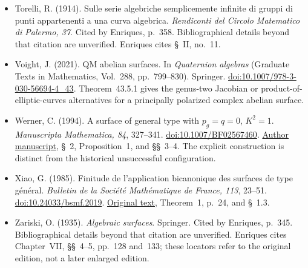 \begin{sloppypar}
\begin{itemize}
\item Torelli, R. (1914). Sulle serie algebriche semplicemente infinite di gruppi di punti appartenenti a una curva algebrica. \emph{Rendiconti del Circolo Matematico di Palermo, 37}. Cited by Enriques, p.~358. Bibliographical details beyond that citation are unverified. Enriques cites \S~II, no.~11.

\item Voight, J. (2021). QM abelian surfaces. In \emph{Quaternion algebras} (Graduate Texts in Mathematics, Vol.~288, pp.~799--830). Springer. \href{https://doi.org/10.1007/978-3-030-56694-4_43}{doi:10.1007/978-3-030-56694-4\_43}. Theorem~43.5.1 gives the genus-two Jacobian or product-of-elliptic-curves alternatives for a principally polarized complex abelian surface.

\item Werner, C. (1994). A surface of general type with $p_g=q=0$, $K^2=1$. \emph{Manuscripta Mathematica, 84}, 327--341. \href{https://doi.org/10.1007/BF02567460}{doi:10.1007/BF02567460}. \href{https://arxiv.org/abs/alg-geom/9408007}{Author manuscript}, \S~2, Proposition~1, and \S\S~3--4. The explicit construction is distinct from the historical unsuccessful configuration.

\item Xiao, G. (1985). Finitude de l'application bicanonique des surfaces de type général. \emph{Bulletin de la Société Mathématique de France, 113}, 23--51. \href{https://doi.org/10.24033/bsmf.2019}{doi:10.24033/bsmf.2019}. \href{https://www.numdam.org/article/BSMF_1985__113__23_0.pdf}{Original text}, Theorem~1, p.~24, and \S~1.3.

\item Zariski, O. (1935). \emph{Algebraic surfaces}. Springer. Cited by Enriques, p.~345. Bibliographical details beyond that citation are unverified. Enriques cites Chapter~VII, \S\S~4--5, pp.~128 and~133; these locators refer to the original edition, not a later enlarged edition.
\end{itemize}
\end{sloppypar}
